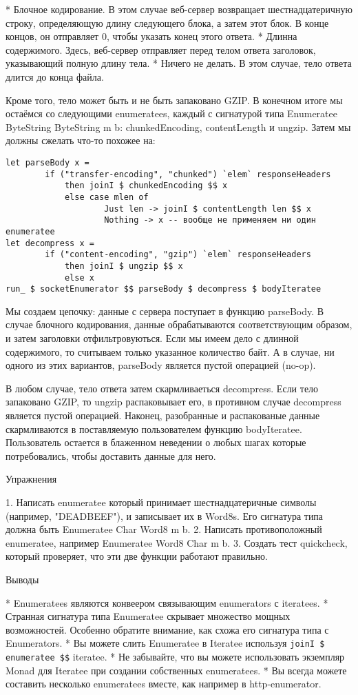 * Блочное кодирование. В этом случае веб-сервер возвращает шестнадцатеричную строку, определяющую длину следующего блока, а затем этот блок. В конце концов, он отправляет 0, чтобы указать конец этого ответа.
* Длинна содержимого. Здесь, веб-сервер отправляет перед телом ответа заголовок, указывающий полную длину тела.
* Ничего не делать. В этом случае, тело ответа длится до конца файла.

Кроме того, тело может быть и не быть запаковано GZIP. В конечном итоге мы остаёмся со следующими enumeratees, каждый с сигнатурой типа Enumeratee ByteString ByteString m b: chunkedEncoding, contentLength и ungzip. Затем мы должны сжелать что-то похожее на:

\begin{lstlisting}
let parseBody x =
        if ("transfer-encoding", "chunked") `elem` responseHeaders
            then joinI $ chunkedEncoding $$ x
            else case mlen of
                    Just len -> joinI $ contentLength len $$ x
                    Nothing -> x -- вообще не применяем ни один enumeratee
let decompress x =
        if ("content-encoding", "gzip") `elem` responseHeaders
            then joinI $ ungzip $$ x
            else x
run_ $ socketEnumerator $$ parseBody $ decompress $ bodyIteratee
\end{lstlisting}

Мы создаем цепочку: данные с сервера поступает в функцию parseBody. В случае блочного кодирования, данные обрабатываются соответствующим образом, и затем заголовки отфильтровуються. Если мы имеем дело с длинной содержимого, то считываем только указанное количество байт. А в случае, ни одного из этих вариантов, parseBody является пустой операцией (no-op).

В любом случае, тело ответа затем скармливаеться decompress. Если тело запаковано GZIP, то ungzip распаковывает его, в противном случае decompress является пустой операцией. Наконец, разобранные и распакованые данные скармливаются в поставляемую пользователем функцию bodyIteratee. Пользователь остается в блаженном неведении о любых шагах которые потребовались, чтобы доставить данные для него.

Упражнения

1. Написать enumeratee который принимает шестнадцатеричные символы (например, "DEADBEEF"), и записывает их в Word8s. Его сигнатура типа должна быть Enumeratee Char Word8 m b.
2. Написать противоположный enumeratee, например Enumeratee Word8 Char m b.
3. Создать тест quickcheck, который проверяет, что эти две функции работают правильно.

Выводы

* Enumeratees являются конвеером связывающим enumerators с iteratees.
* Странная сигнатура типа Enumeratee скрывает множество мощных возможностей. Особенно обратите внимание, как схожа его сигнатура типа с Enumerators.
* Вы можете слить Enumeratee в Iteratee используя \lstinline!joinI $ enumeratee $$! iteratee.
* Не забывайте, что вы можете использовать экземпляр Monad для Iteratee при создании собственных enumeratees.
* Вы всегда можете составить несколько enumeratees вместе, как например в http-enumerator.
